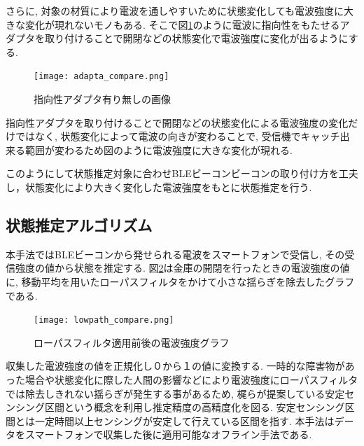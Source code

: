 \documentclass[Japanese]{dicomopapers}
\begin{document}
さらに, 対象の材質により電波を通しやすいために状態変化しても電波強度に大きな変化が現れないモノもある.
そこで図\ref{adapter}のように電波に指向性をもたせるアダプタを取り付けることで開閉などの状態変化で電波強度に変化が出るようにする.


\begin{figure}[ht]
 \centering
 \texttt{[image: adapta\_compare.png]}
 \caption{指向性アダプタ有り無しの画像}
 \label{adapter}
\end{figure}

指向性アダプタを取り付けることで開閉などの状態変化による電波強度の変化だけではなく, 状態変化によって電波の向きが変わることで, 受信機でキャッチ出来る範囲が変わるため図のように電波強度に大きな変化が現れる.

このようにして状態推定対象に合わせBLEビーコンビーコンの取り付け方を工夫し，状態変化により大きく変化した電波強度をもとに状態推定を行う.

\subsection{状態推定アルゴリズム}
本手法ではBLEビーコンから発せられる電波をスマートフォンで受信し, その受信強度の値から状態を推定する.
図\ref{bank-opcl}は金庫の開閉を行ったときの電波強度の値に, 移動平均を用いたローパスフィルタをかけて小さな揺らぎを除去したグラフである.

\begin{figure}[t]
 \centering
 \texttt{[image: lowpath\_compare.png]}
 \caption{ローパスフィルタ適用前後の電波強度グラフ}
 \label{bank-opcl}
\end{figure}

収集した電波強度の値を正規化し０から１の値に変換する.
一時的な障害物があった場合や状態変化に際した人間の影響などにより電波強度にローパスフィルタでは除去しきれない揺らぎが発生する事があるため, 梶ら\cite{sensing-area}が提案している安定センシング区間という概念を利用し推定精度の高精度化を図る.
安定センシング区間とは一定時間以上センシングが安定して行えている区間を指す.
本手法はデータをスマートフォンで収集した後に適用可能なオフライン手法である.
\end{document}
